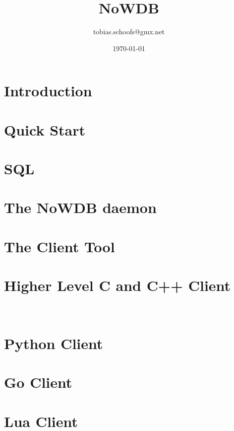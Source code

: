 \documentclass{scrreprt}
\begin{document}
\setlength{\parindent}{0pt}
\setlength{\parskip}{8pt}

\title {NoWDB}
\author {tobias.schoofs@gmx.net}
\date{\today}
\maketitle
\tableofcontents

\chapter{Introduction}\label{chpt_intro} 

\chapter{Quick Start}\label{chpt_quickst}


\chapter{SQL}\label{chpt_sql}


\chapter{The NoWDB daemon}\label{chpt_nowdbd}
\chapter{The Client Tool}\label{chpt_clienttool}

\chapter{Higher Level C and C++ Client}\label{chpt_ccpp}
\CC\

\chapter{Python Client}\label{chpt_pythonclient}

\chapter{Go Client}\label{chpt_goclient}

\chapter{Lua Client}\label{chpt_luaclient}
\end{document}
